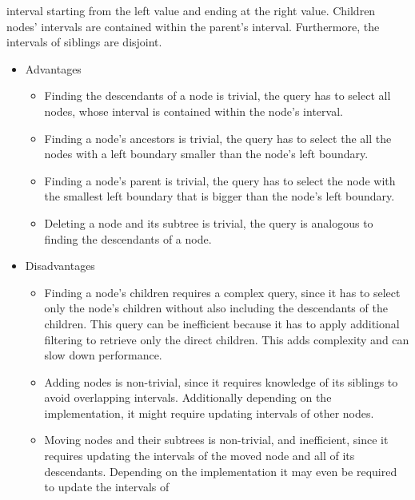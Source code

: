\begin{itemize}
	      interval starting from the left value and ending at the right value.
	      Children nodes' intervals are contained within the parent's interval. Furthermore, the
	      intervals of siblings are disjoint.
	      \begin{itemize}
		      \item Advantages
		            \begin{itemize}
			            \item Finding the descendants of a node is trivial, the query has to select all
			                  nodes, whose interval is contained within the node's interval.
			            \item Finding a node's ancestors is trivial, the query has to select the all the
			                  nodes with a left boundary smaller than the node's left boundary.
			            \item Finding a node's parent is trivial, the query has to select the node with
			                  the smallest left boundary that is bigger than the node's left boundary.
			            \item Deleting a node and its subtree is trivial, the query is analogous to finding
			                  the descendants of a node.
		            \end{itemize}
		      \item Disadvantages
		            \begin{itemize}
			            \item Finding a node's children requires a complex query, since it has to select
			                  only the node's children without also including the descendants of the
			                  children. This query can be inefficient because it has to apply additional filtering
			                  to retrieve only the direct children. This adds complexity and can slow down
			                  performance.
			            \item Adding nodes is non-trivial, since it requires knowledge of its siblings to
			                  avoid overlapping intervals. Additionally depending on the implementation, it
			                  might require updating intervals of other nodes.
			            \item Moving nodes and their subtrees is non-trivial, and inefficient, since it requires updating
			                  the intervals of the moved node and all of its descendants.
			                  Depending on the implementation it may even be required to update the intervals of

\end{itemize}
\end{itemize}
\end{itemize}
